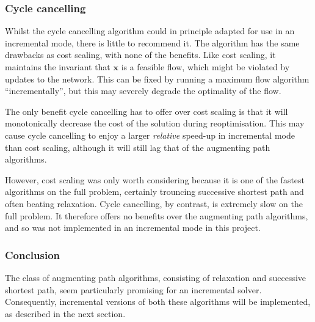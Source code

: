 \subsubsection{Cycle cancelling}

Whilst the cycle cancelling algorithm could in principle adapted for use in an incremental mode, there is little to recommend it. The algorithm has the same drawbacks as cost scaling, with none of the benefits. Like cost scaling, it maintains the invariant that $\mathbf{x}$ is a feasible flow, which might be violated by updates to the network. This can be fixed by running a maximum flow algorithm ``incrementally'', but this may severely degrade the optimality of the flow. 

The only benefit cycle cancelling has to offer over cost scaling is that it will monotonically decrease the cost of the solution during reoptimisation\footnotemark. This may cause cycle cancelling to enjoy a larger \emph{relative} speed-up in incremental mode than cost scaling, although it will still lag that of the augmenting path algorithms.

However, cost scaling was only worth considering because it is one of the fastest algorithms on the full problem, certainly trouncing successive shortest path and often beating relaxation. Cycle cancelling, by contrast, is extremely slow on the full problem. It therefore offers no benefits over the augmenting path algorithms, and so was not implemented in an incremental mode in this project.

\subsubsection{Conclusion}

The class of augmenting path algorithms, consisting of relaxation and successive shortest path, seem particularly promising for an incremental solver. Consequently, incremental versions of both these algorithms will be implemented, as described in the next section.

